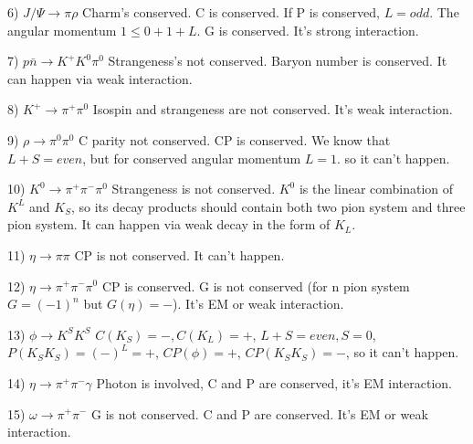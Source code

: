 \documentclass{article}
\begin{document}
6) $J/\Psi\rightarrow\pi\rho$
Charm's conserved. C is conserved. If P is conserved, $L=odd$. The angular momentum $1\leq0+1+L$. G is conserved. It's strong interaction.

7) $p\bar n\rightarrow K^+K^0\pi^0$
Strangeness's not conserved. Baryon number is conserved. It can happen via weak interaction.

8) $K^+\rightarrow\pi^+\pi^0$
Isospin and strangeness are not conserved. It's weak interaction.

9) $\rho\rightarrow\pi^0\pi^0$
C parity not conserved. CP is conserved. We know that $L+S=even$, but for conserved angular momentum $L=1$. so it can't happen.

10) $K^0\rightarrow\pi^+\pi^-\pi^0$
Strangeness is not conserved. $K^0$ is the linear combination of $K^L$ and $K_S$, so its decay products should contain both two pion system and three pion system. It can happen via weak decay in the form of $K_L$.

11) $\eta\rightarrow\pi\pi$
CP is not conserved. It can't happen.

12) $\eta\rightarrow\pi^+\pi^-\pi^0$
CP is conserved. G is not conserved (for n pion system $G=(-1)^n$ but $G(\eta)=-$). It's EM or weak interaction.

13) $\phi\rightarrow K^SK^S$
$C(K_S)=-,C(K_L)=+$, $L+S=even,S=0$, $P(K_SK_S)=(-)^L=+$, $CP(\phi)=+$, $CP(K_SK_S)=-$, so it can't happen.

14) $\eta\rightarrow\pi^+\pi^-\gamma$
Photon is involved, C and P are conserved, it's EM interaction.

15) $\omega\rightarrow\pi^+\pi^-$
G is not conserved. C and P are conserved. It's EM or weak interaction.

\end{document}
